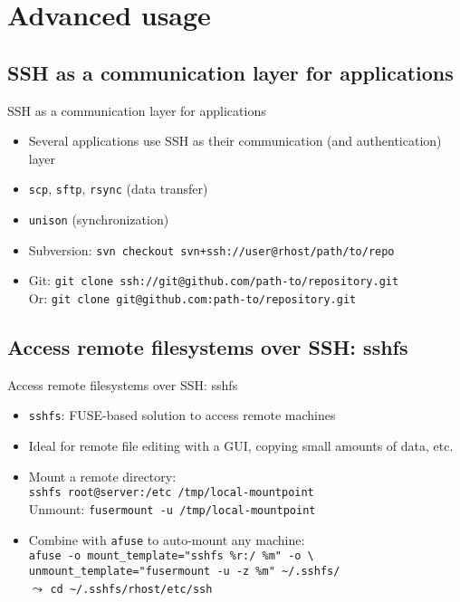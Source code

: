 \documentclass[11pt,final,usepdftitle=false]{beamer}
\newcommand{\tilda}{\textasciitilde{}}
\begin{document}
\section{Advanced usage}

\subsection{SSH as a communication layer for applications}
\begin{frame}{SSH as a communication layer for applications}
	\begin{itemize}
		\item Several applications use SSH as their communication (and authentication) layer
		\hbr
		\item \texttt{scp}, \texttt{sftp}, \texttt{rsync} (data transfer)
			\hbr
		\item \texttt{unison} (synchronization)
		\hbr

	\item \alert{Subversion:} \texttt{svn checkout svn+ssh://user@rhost/path/to/repo}
		\hbr
	\item \alert{Git:} \texttt{git clone ssh://git@github.com/path-to/repository.git}\\
	 Or: \texttt{git clone git@github.com:path-to/repository.git}
	\end{itemize}
\end{frame}

\subsection{Access remote filesystems over SSH: sshfs}
\begin{frame}[fragile]{Access remote filesystems over SSH: sshfs}
	\begin{itemize}
		\item \texttt{sshfs}: FUSE-based solution to access remote machines
			\hbr
	\item Ideal for remote file editing with a GUI, copying small amounts of data, etc.
			\hbr
		\item Mount a remote directory:\\
			\texttt{sshfs root@server:/etc /tmp/local-mountpoint}\\
			Unmount: \texttt{fusermount -u /tmp/local-mountpoint}
		\hbr
	\item Combine with \texttt{afuse} to auto-mount any machine:\\
	 \texttt{afuse -o mount\_template="sshfs \%r:/ \%m" -o \textbackslash \\
	 unmount\_template="fusermount -u -z \%m" \tilda/.sshfs/}\\[0.5em]
			$\leadsto$ \texttt{cd \tilda/.sshfs/rhost/etc/ssh}
	\end{itemize}
\end{frame}
\end{document}
